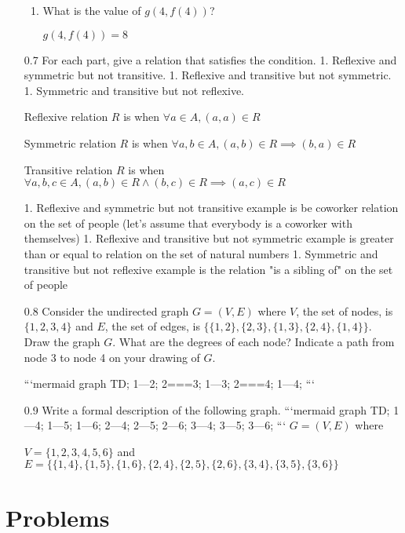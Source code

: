 \documentclass[12pt, a4paper]{article}
\begin{document}
\begin{enumerate}
\begin{enumerate}
\item What is the value of $g(4, f(4))$?

    $g(4, f(4)) = 8$
\end{enumerate}

    \item[0.7]
For each part, give a relation that satisfies the condition.
1. Reflexive and symmetric but not transitive.
1. Reflexive and transitive but not symmetric.
1. Symmetric and transitive but not reflexive.

Reflexive relation $R$ is when $\forall a \in A, (a, a) \in R$

Symmetric relation $R$ is when $\forall a, b \in A, (a, b) \in R \implies (b, a) \in R$

Transitive relation $R$ is when $\forall a, b, c \in A, (a, b) \in R \land (b, c) \in R \implies (a, c) \in R$

1. Reflexive and symmetric but not transitive example is be coworker relation on the set of people (let's assume that everybody is a coworker with themselves)
1. Reflexive and transitive but not symmetric example is greater than or equal to relation on the set of natural numbers
1. Symmetric and transitive but not reflexive example is the relation "is a sibling of" on the set of people

    \item[0.8]
Consider the undirected graph $G = (V, E)$ where $V$, the set of nodes, is $\{1, 2, 3, 4\}$ and $E$, the set of edges, is $\{\{1, 2\}, \{2, 3\}, \{1, 3\}, \{2, 4\}, \{1, 4\}\}$. Draw the graph $G$. What are the degrees of each node? Indicate a path from node 3 to node 4 on your drawing of $G$.

```mermaid
graph TD;
    1---2;
    2===3;
    1---3;
    2===4;
    1---4;
```

    \item[0.9]
Write a formal description of the following graph.
```mermaid
graph TD;
    1---4;
    1---5;
    1---6;
    2---4;
    2---5;
    2---6;
    3---4;
    3---5;
    3---6;
```
$G = (V, E)$ where 

$V = \{1, 2, 3, 4, 5, 6\}$ and $E = \{\{1, 4\}, \{1, 5\}, \{1, 6\}, \{2, 4\}, \{2, 5\}, \{2, 6\}, \{3, 4\}, \{3, 5\}, \{3, 6\}\}$
\end{enumerate}
\section{Problems}
\end{document}
